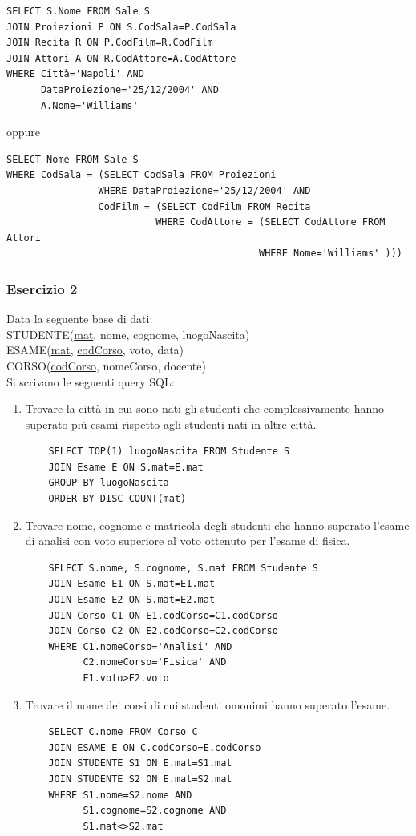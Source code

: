 \documentclass[a4paper]{article}
\begin{document}
\begin{enumerate}[leftmargin=*]
\begin{enumerate}
\begin{verbatim}
SELECT S.Nome FROM Sale S
JOIN Proiezioni P ON S.CodSala=P.CodSala
JOIN Recita R ON P.CodFilm=R.CodFilm
JOIN Attori A ON R.CodAttore=A.CodAttore
WHERE Città='Napoli' AND
      DataProiezione='25/12/2004' AND
      A.Nome='Williams'
\end{verbatim}
oppure
\begin{verbatim}
SELECT Nome FROM Sale S
WHERE CodSala = (SELECT CodSala FROM Proiezioni
                WHERE DataProiezione='25/12/2004' AND
                CodFilm = (SELECT CodFilm FROM Recita
                          WHERE CodAttore = (SELECT CodAttore FROM Attori
                                            WHERE Nome='Williams' )))
\end{verbatim}
\end{enumerate}

\subsubsection{Esercizio 2}
Data la seguente base di dati:\medskip\\
STUDENTE(\underline{mat}, nome, cognome, luogoNascita)\\
ESAME(\underline{mat}, \underline{codCorso}, voto, data)\\
CORSO(\underline{codCorso}, nomeCorso, docente)\medskip\\
Si scrivano le seguenti query SQL:
\begin{enumerate}
  \item Trovare la città in cui sono nati gli studenti che complessivamente hanno superato più esami rispetto agli studenti nati in altre città.
  \begin{verbatim}
    SELECT TOP(1) luogoNascita FROM Studente S
    JOIN Esame E ON S.mat=E.mat
    GROUP BY luogoNascita
    ORDER BY DISC COUNT(mat)
  \end{verbatim}
  \item Trovare nome, cognome e matricola degli studenti che hanno superato l'esame di analisi con voto superiore al voto ottenuto per l'esame di fisica.
  \begin{verbatim}
    SELECT S.nome, S.cognome, S.mat FROM Studente S
    JOIN Esame E1 ON S.mat=E1.mat
    JOIN Esame E2 ON S.mat=E2.mat
    JOIN Corso C1 ON E1.codCorso=C1.codCorso
    JOIN Corso C2 ON E2.codCorso=C2.codCorso
    WHERE C1.nomeCorso='Analisi' AND
          C2.nomeCorso='Fisica' AND
          E1.voto>E2.voto
  \end{verbatim}
  \item Trovare il nome dei corsi di cui studenti omonimi hanno superato l'esame.
  \begin{verbatim}
    SELECT C.nome FROM Corso C
    JOIN ESAME E ON C.codCorso=E.codCorso
    JOIN STUDENTE S1 ON E.mat=S1.mat
    JOIN STUDENTE S2 ON E.mat=S2.mat
    WHERE S1.nome=S2.nome AND
          S1.cognome=S2.cognome AND
          S1.mat<>S2.mat
  \end{verbatim}
\end{enumerate}


\end{enumerate}
\end{document}
